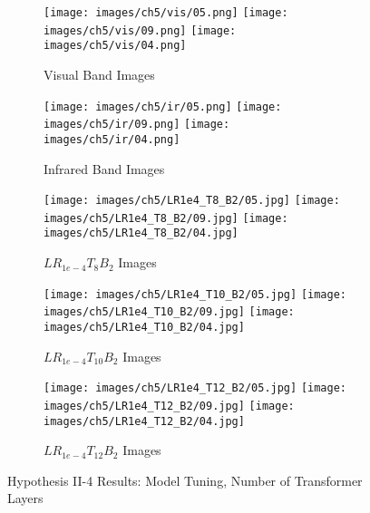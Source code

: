 \begin{figure}[htbp]
    \centering
    \begin{subfigure}[b]{\textwidth}
        \texttt{[image: images/ch5/vis/05.png]}
        \texttt{[image: images/ch5/vis/09.png]}
        \texttt{[image: images/ch5/vis/04.png]}
        \caption{Visual Band Images}
    \end{subfigure}
    \vspace{0.01cm}
    \begin{subfigure}[b]{\textwidth}
        \texttt{[image: images/ch5/ir/05.png]}
        \texttt{[image: images/ch5/ir/09.png]}
        \texttt{[image: images/ch5/ir/04.png]}
        \caption{Infrared Band Images}
    \end{subfigure}
    \vspace{0.01cm}
    \begin{subfigure}[b]{\textwidth}
        \texttt{[image: images/ch5/LR1e4\_T8\_B2/05.jpg]}
        \texttt{[image: images/ch5/LR1e4\_T8\_B2/09.jpg]}
        \texttt{[image: images/ch5/LR1e4\_T8\_B2/04.jpg]}
        \caption{$LR_{1e-4}T_{8}B_{2}$ Images}
    \end{subfigure}
    \vspace{0.01cm}
    \begin{subfigure}[b]{\textwidth}
        \texttt{[image: images/ch5/LR1e4\_T10\_B2/05.jpg]}
        \texttt{[image: images/ch5/LR1e4\_T10\_B2/09.jpg]}
        \texttt{[image: images/ch5/LR1e4\_T10\_B2/04.jpg]}
        \caption{$LR_{1e-4}T_{10}B_{2}$ Images}
    \end{subfigure}
    \begin{subfigure}[b]{\textwidth}
        \texttt{[image: images/ch5/LR1e4\_T12\_B2/05.jpg]}
        \texttt{[image: images/ch5/LR1e4\_T12\_B2/09.jpg]}
        \texttt{[image: images/ch5/LR1e4\_T12\_B2/04.jpg]}
        \caption{$LR_{1e-4}T_{12}B_{2}$ Images}
    \end{subfigure}
    \caption{Hypothesis II-4 Results: Model Tuning, Number of Transformer Layers}
    \label{fig:ch5:met81}
\end{figure}

